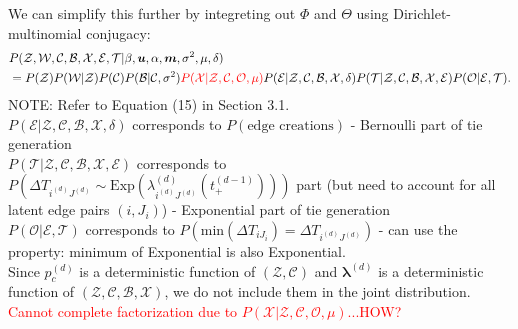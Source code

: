 \documentclass[a4paper]{article}
\begin{document}
We can simplify this further by integreting out $\Phi$ and $\Theta$ using Dirichlet-multinomial conjugacy:
\begin{equation}
\begin{aligned}
&P(\mathcal{Z}, \mathcal{W}, \mathcal{C}, \mathcal{B},\mathcal{X}, \mathcal{E}, \mathcal{T}| \beta, \boldsymbol{u}, \alpha, \boldsymbol{m}, \sigma^2, \mu, \delta) \\& 
= P(\mathcal{Z})P(\mathcal{W}|\mathcal{Z}) P(\mathcal{C})P(\mathcal{B}|\mathcal{C}, \sigma^2)\textcolor{red}{P(\mathcal{X}|\mathcal{Z}, \mathcal{C}, \mathcal{O}, \mu)}
P(\mathcal{E}| \mathcal{Z}, \mathcal{C}, \mathcal{B}, \mathcal{X}, \delta)P(\mathcal{T}|\mathcal{Z}, \mathcal{C}, \mathcal{B}, \mathcal{X}, \mathcal{E})P(\mathcal{O}|\mathcal{E}, \mathcal{T}).
\end{aligned}
\end{equation}
NOTE: Refer to Equation (15) in Section 3.1. \\\newline$P(\mathcal{E}| \mathcal{Z}, \mathcal{C}, \mathcal{B}, \mathcal{X}, \delta)$ corresponds to $P(\mbox{edge creations})$ - Bernoulli part of tie generation\\\newline $P(\mathcal{T}|\mathcal{Z}, \mathcal{C}, \mathcal{B}, \mathcal{X}, \mathcal{E})$ corresponds to $P(\Delta T_{i^{(d)}J^{(d)}}\sim \mbox{Exp}(\lambda^{(d)}_{i^{(d)}{J^{(d)}}}(t_+^{(d-1)})))$ part (but need to account for all latent edge pairs $(i, J_i)$) - Exponential part of tie generation\\\newline
$P(\mathcal{O}|\mathcal{E}, \mathcal{T})$ corresponds to $P(\mbox{min}(\Delta T_{i{J_i}}) = \Delta T_{i^{(d)}{J^{(d)}}})$ - can use the property: minimum of Exponential is also Exponential. \\ \newline
Since $p_c^{(d)}$ is a deterministic function of $(\mathcal{Z}, \mathcal{C})$ and $\boldsymbol{\lambda}^{(d)}$ is a deterministic function of $(\mathcal{Z}, \mathcal{C}, \mathcal{B}, \mathcal{X})$, we do not include them in the joint distribution.\\ \newline
\textcolor{red} {Cannot complete factorization due to $P(\mathcal{X}|\mathcal{Z}, \mathcal{C}, \mathcal{O}, \mu)$...HOW?}
\end{document}
